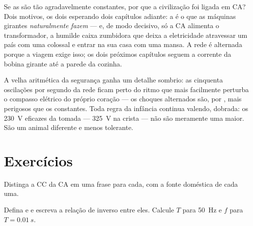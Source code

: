 \begin{remark}\label{rem:g9:alternating-current:why}
Se as  são tão agradavelmente constantes, por que a civilização
foi ligada em CA? Dois motivos, os dois esperando dois capítulos
adiante: a  é o que as máquinas girantes
\emph{naturalmente fazem} --- e, de modo decisivo, só a CA alimenta o
transformador, a humilde caixa zumbidora que deixa a eletricidade
atravessar um país com uma  colossal e entrar na sua casa com
uma  mansa. A rede é alternada porque a viagem exige isso; os
dois próximos capítulos seguem a corrente da bobina girante até a
parede da cozinha.
\end{remark}

\begin{remark}\label{rem:g9:alternating-current:safety}
A velha aritmética da segurança ganha um detalhe sombrio: as
cinquenta oscilações por segundo da rede ficam perto do ritmo que
mais facilmente perturba o compasso elétrico do próprio coração ---
os choques alternados são,  por , mais perigosos que os
constantes. Toda regra da infância continua valendo, dobrada: os
\qty{230}{V} eficazes da tomada --- \qty{325}{V} na crista --- não
são meramente uma  maior. São um animal diferente e menos
tolerante.
\end{remark}

\section{Exercícios}

\begin{exercise}[$\star$]\label{exo:g9:alternating-current:1}
Distinga a CC da CA em uma frase para cada, com a fonte doméstica de
cada uma.
\end{exercise}

\begin{exercise}[$\star$]\label{exo:g9:alternating-current:2}
Defina  e  e escreva a relação de inverso entre
eles. Calcule $T$ para \qty{50}{Hz} e $f$ para $T = \qty{0.01}{s}$.
\end{exercise}

